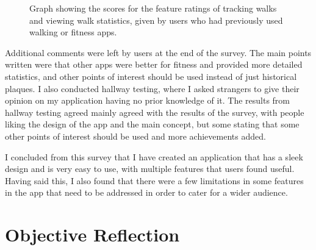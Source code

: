 \begin{figure}[htb]
    \centering
    \caption{Graph showing the scores for the feature ratings of tracking walks and viewing walk statistics, given by users who had previously used walking or fitness apps.}
    \label{fig:survey-graph}
\end{figure}

Additional comments were left by users at the end of the survey. The main points written were that other apps were better for fitness and provided more detailed statistics, and other points of interest should be used instead of just historical plaques. I also conducted hallway testing, where I asked strangers to give their opinion on my application having no prior knowledge of it. The results from hallway testing agreed mainly agreed with the results of the survey, with people liking the design of the app and the main concept, but some stating that some other points of interest should be used and more achievements added.

I concluded from this survey that I have created an application that has a sleek design and is very easy to use, with multiple features that users found useful. Having said this, I also found that there were a few limitations in some features in the app that need to be addressed in order to cater for a wider audience.

\section{Objective Reflection}

